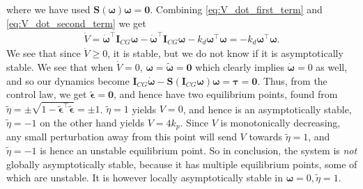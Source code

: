 where we have used $\mathbf{S}(\boldsymbol{\omega})\boldsymbol{\omega} = \mathbf{0}$. Combining \ref{eq:V_dot_first_term} and \ref{eq:V_dot_second_term} we get
\begin{equation}\begin{aligned}
\dot{V}
= \dot{\boldsymbol{\omega}}^\top \mathbf{I}_{CG}\boldsymbol{\omega}
- \dot{\boldsymbol{\omega}}^\top \mathbf{I}_{CG}\boldsymbol{\omega}
- k_d\boldsymbol{\omega}^\top\boldsymbol{\omega}
= -k_d \boldsymbol{\omega}^{\top} \boldsymbol{\omega}.
\end{aligned}\end{equation}
We see that since $\dot V \geq 0$, it is stable, but we do not know if it is asymptotically stable. We see that when $\dot V = 0$, $\boldsymbol{\omega} = \tilde{\boldsymbol{\omega}} = \mathbf{0}$ which clearly implies $\dot{\boldsymbol{\omega}} = 0$ as well, and so our dynamics become $\mathbf{I}_{CG} \dot{\boldsymbol{\omega}} - \mathbf{S}(\mathbf{I}_{CG}\mathbf{\omega})\boldsymbol{\omega} = \boldsymbol{\tau} = \mathbf{0}$. Thus, from the control law, we get $\tilde{\boldsymbol{\epsilon}} = \mathbf{0}$, and hence have two equilibrium points, found from $\tilde \eta = \pm \sqrt{1-\tilde{\boldsymbol{\epsilon}}^\top \tilde{\boldsymbol{\epsilon}}} = \pm1$. $\tilde \eta = 1$ yields $V = 0$, and hence is an asymptotically stable, $\tilde \eta = -1$ on the other hand yields $V = 4k_p$. Since $V$ is monotonically decreasing, any small perturbation away from this point will send $V$ towards $\tilde \eta = 1$, and $\tilde \eta = -1$ is hence an unstable equilibrium point. So in conclusion, the system is \textit{not} globally asymptotically stable, because it has multiple equilibrium points, some of which are unstable. It is however locally asymptotically stable in $\boldsymbol{\omega} = 0, \tilde \eta = 1$.
